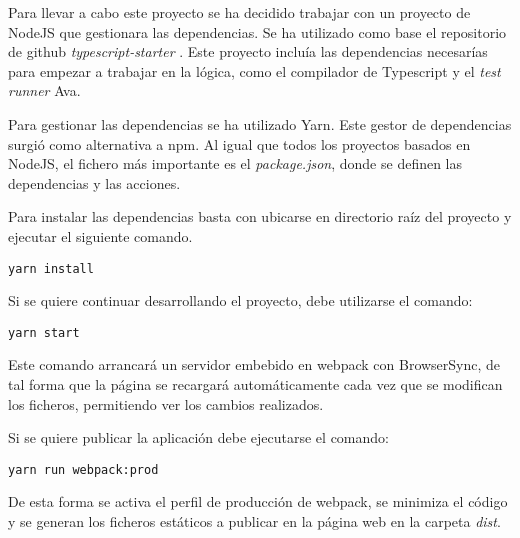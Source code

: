 Para llevar a cabo este proyecto se ha decidido trabajar con un proyecto de NodeJS que gestionara
las dependencias. Se ha utilizado como base el repositorio de github \textit{typescript-starter} \cite{TypescriptStarter}.
Este proyecto incluía las dependencias necesarías para empezar a trabajar en la lógica, como 
el compilador de Typescript y el \textit{test runner} Ava.

\bigskip
Para gestionar las dependencias se ha utilizado Yarn\cite{yarn}. Este gestor de dependencias surgió
como alternativa a npm\cite{npm}. Al igual que todos los proyectos basados en NodeJS, el fichero
más importante es el \textit{package.json}, donde se definen las dependencias y las acciones.

\bigskip
Para instalar las dependencias basta con ubicarse en directorio raíz del proyecto y ejecutar el siguiente
comando.

\begin{lstlisting}
yarn install
\end{lstlisting}

\bigskip
Si se quiere continuar desarrollando el proyecto, debe utilizarse el comando: 
\begin{lstlisting}
yarn start
\end{lstlisting}

Este comando arrancará un servidor embebido en webpack con BrowserSync, de tal forma que la 
página se recargará automáticamente cada vez que se modifican los ficheros, 
permitiendo ver los cambios realizados.

\bigskip
Si se quiere publicar la aplicación debe ejecutarse el comando:
\begin{lstlisting}
yarn run webpack:prod
\end{lstlisting}

De esta forma se activa el perfil de producción de webpack, se minimiza el código y se generan 
los ficheros estáticos a publicar en la página web en la carpeta \textit{dist}.
